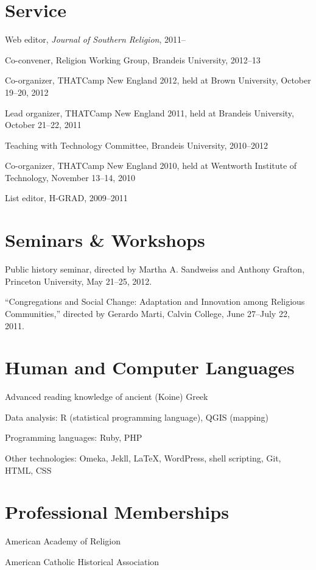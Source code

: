 \documentclass[11pt]{article}
\begin{document}
\section{Service}

Web editor, \emph{Journal of Southern Religion}, 2011--

Co-convener, Religion Working Group, Brandeis University, 
2012--13

Co-organizer, THATCamp New England 2012, held at Brown University,
October 19--20, 2012

Lead organizer, THATCamp New England 2011, held at Brandeis University, 
October 21--22, 2011

Teaching with Technology Committee, Brandeis University, 2010--2012

Co-organizer, THATCamp New England 2010, held at Wentworth Institute of 
Technology, November 13--14, 2010

List editor, H-GRAD, 2009--2011

\section{Seminars \& Workshops}

Public history seminar, directed by Martha A. Sandweiss and 
Anthony Grafton, Princeton University, May 21--25, 2012.

``Congregations and Social Change: Adaptation and Innovation among 
Religious Communities,'' directed by Gerardo Marti, Calvin College, June 
27--July 22, 2011.

\section{Human and Computer Languages}

Advanced reading knowledge of ancient (Koine) Greek

Data analysis: R (statistical programming language), QGIS (mapping)

Programming languages: Ruby, PHP

Other technologies: Omeka, Jekll, \LaTeX{}, \mbox{WordPress}, shell scripting, 
Git, HTML, CSS

\section{Professional Memberships}

American Academy of Religion

American Catholic Historical Association
\end{document}
